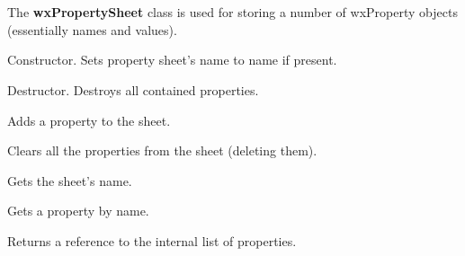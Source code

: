 \section{}\label{wxpropertysheet}


The {\bf wxPropertySheet} class is used for storing a number of
wxProperty objects (essentially names and values).



Constructor. Sets property sheet's name to name if present.



Destructor. Destroys all contained properties.

\label{wxpropertysheetaddproperty}


Adds a property to the sheet.

\label{wxpropertysheetclear}


Clears all the properties from the sheet (deleting them).

\label{wxpropertysheetgetname}


Gets the sheet's name.

\label{wxpropertysheetgetproperty}


Gets a property by name.

\label{wxpropertysheetgetproperties}


Returns a reference to the internal list of properties.

\label{wxpropertysheethasproperty}

